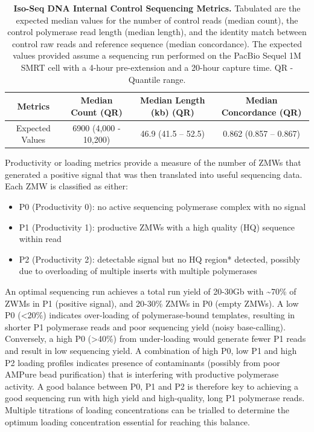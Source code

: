 \vspace{1cm}
\begin{table}[!h]
	\caption[Iso-Seq DNA Internal Control Sequencing Metrics]%
	{\textbf{Iso-Seq DNA Internal Control Sequencing Metrics.} Tabulated are the expected median values for the number of control reads (median count), the control polymerase read length (median length), and the identity match between control raw reads and reference sequence (median concordance). The expected values provided assume a sequencing run performed on the PacBio Sequel 1M SMRT cell with a 4-hour pre-extension and a 20-hour capture time. QR - Quantile range.}	\label{tab:control_Isoseqmetrics}
	
	\centering
	\begin{tabular}{@{}cccc@{}}
		\toprule
		Metrics         & Median Count (QR)     & Median Length (kb) (QR) & Median Concordance (QR) \\ \midrule
		Expected Values & 6900 (4,000 - 10,200) & 46.9 (41.5 – 52.5) & 0.862 (0.857 – 0.867)   \\ \bottomrule
	\end{tabular}
\end{table}


Productivity or loading metrics provide a measure of the number of ZMWs that generated a positive signal that was then translated into useful sequencing data. Each ZMW is classified as either: 
\begin{itemize}
	\item P0 (Productivity 0): no active sequencing polymerase complex with no signal 
	\item P1 (Productivity 1): productive ZMWs with a high quality (HQ) sequence within read
	\item P2 (Productivity 2): detectable signal but no HQ region* detected, possibly due to overloading of multiple inserts with multiple polymerases
\end{itemize}

An optimal sequencing run achieves a total run yield of 20-30Gb with \textasciitilde70\% of ZWMs in P1 (positive signal), and 20-30\% ZMWs in P0 (empty ZMWs). A low P0 (<20\%) indicates over-loading of polymerase-bound templates, resulting in shorter P1 polymerase reads and poor sequencing yield (noisy base-calling). Conversely, a high P0 (>40\%) from under-loading would generate fewer P1 reads and result in low sequencing yield. A combination of high P0, low P1 and high P2 loading profiles indicates presence of contaminants (possibly from poor AMPure bead purification) that is interfering with productive polymerase activity. A good balance between P0, P1 and P2 is therefore key to achieving a good sequencing run with high yield and high-quality, long P1 polymerase reads. Multiple titrations of loading concentrations can be trialled to determine the optimum loading concentration essential for reaching this balance. 

